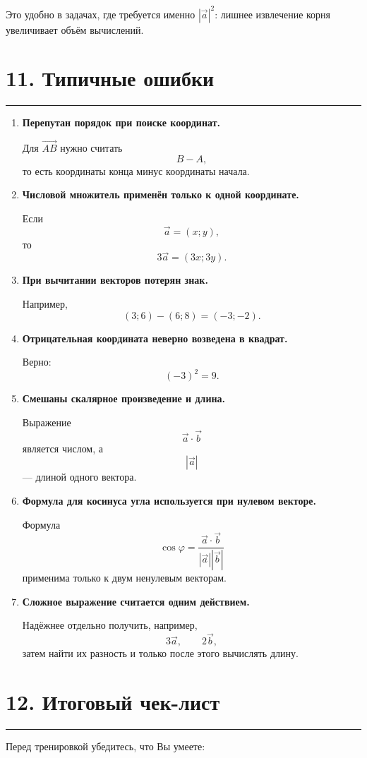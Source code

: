 \documentclass[a4paper,12pt]{article}
\newcommand{\vect}[1]{\overrightarrow{#1}}
\newcommand{\vct}[1]{\vec{#1}}
\newcommand{\modv}[1]{\left|#1\right|}
\newcommand{\sectionline}{%
    \vspace{0.1em}
    {\color{accent}\rule{\linewidth}{0.6pt}}
    \vspace{0.3em}
}
\newcommand{\topic}[1]{%
    \Needspace{7\baselineskip}%
    \section*{\color{darkaccent}#1}
    \sectionline
}
\begin{document}
Это удобно в задачах, где требуется именно \(\modv{\vct a}^{2}\): лишнее извлечение корня увеличивает объём вычислений.

\topic{11. Типичные ошибки}

\begin{enumerate}
    \item \textbf{Перепутан порядок при поиске координат.}

    Для \(\vect{AB}\) нужно считать
    \[
    B-A,
    \]
    то есть координаты конца минус координаты начала.

    \item \textbf{Числовой множитель применён только к одной координате.}

    Если
    \[
    \vct a=(x;y),
    \]
    то
    \[
    3\vct a=(3x;3y).
    \]

    \item \textbf{При вычитании векторов потерян знак.}

    Например,
    \[
    (3;6)-(6;8)=(-3;-2).
    \]

    \item \textbf{Отрицательная координата неверно возведена в квадрат.}

    Верно:
    \[
    (-3)^2=9.
    \]

    \item \textbf{Смешаны скалярное произведение и длина.}

    Выражение
    \[
    \vct a\cdot\vct b
    \]
    является числом, а
    \[
    \modv{\vct a}
    \]
    --- длиной одного вектора.

    \item \textbf{Формула для косинуса угла используется при нулевом векторе.}

    Формула
    \[
    \cos\varphi
    =
    \frac{\vct a\cdot\vct b}
    {\modv{\vct a}\modv{\vct b}}
    \]
    применима только к двум ненулевым векторам.

    \item \textbf{Сложное выражение считается одним действием.}

    Надёжнее отдельно получить, например,
    \[
    3\vct a,
    \qquad
    2\vct b,
    \]
    затем найти их разность и только после этого вычислять длину.
\end{enumerate}

\clearpage
\topic{12. Итоговый чек-лист}

Перед тренировкой убедитесь, что Вы умеете:
\end{document}
